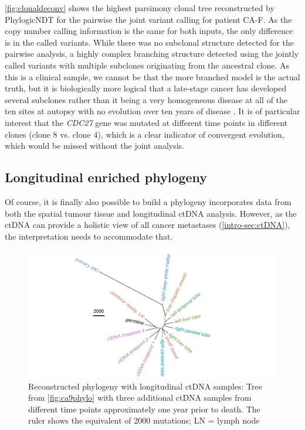 \autoref{fig:clonaldeconv} shows the highest parsimony clonal tree reconstructed by PhylogicNDT for the pairwise  the joint variant calling for patient CA-F. As the copy number calling information is the same for both inputs, the only difference is in the called variants. While there was no subclonal structure detected for the pairwise analysis, a highly complex branching structure  detected using the jointly called variants with multiple subclones originating from the ancestral clone. As this is a clinical sample, we cannot be  that the more branched model is the actual truth, but it is biologically more logical that a late-stage cancer has developed several subclones rather than it being a very homogeneous disease at all of the ten sites at autopsy with no evolution over ten years of disease \cite{Gerstung2020}.
It is of particular interest that the \textit{CDC27} gene was mutated at different time points in different clones (clone 8 vs. clone 4), which is a clear indicator of convergent evolution, which would be missed without the joint analysis.


\subsection{Longitudinal enriched phylogeny}
\label{variantcalling-sec:fullphylo}
Of course, it is finally also possible to build a phylogeny  incorporates data from both the spatial tumour tissue and longitudinal ctDNA analysis. However, as the ctDNA can provide a holistic view of all cancer metastases (\autoref{intro-sec:ctDNA}), the interpretation needs to accommodate that. 

\begin{figure}[ht]
\centering
\includegraphics[width=.99\linewidth]{Figures/jointVariantCalling/phyloCA9_withctDNA.pdf}
\caption[Reconstructed phylogeny with longitudinal ctDNA samples]{Reconstructed phylogeny with longitudinal ctDNA samples: Tree from \autoref{fig:ca9phylo} with three additional ctDNA samples from different time points approximately one year prior to death. The ruler shows the equivalent of 2000 mutations; LN = lymph node} \label{fig:phyloCA9ctDNA}
\end{figure}

